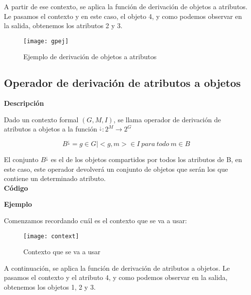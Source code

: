         A partir de ese contexto, se aplica la funci\'on de derivaci\'on de objetos a atributos. 
        Le pasamos el contexto y en este caso, el objeto 4, y como podemos observar en la salida, obtenemos los atributos 2 y 3.

        \begin{figure}[H]
            \centering
            \texttt{[image: gpej]}
            \caption{Ejemplo de derivaci\'on de objetos a atributos}
            \label{fig:gpej}
        \end{figure}



    \subsection{Operador de derivaci\'on de atributos a objetos}

        \textbf{Descripci\'on}

        Dado un contexto formal \( (G, M, I) \), se llama operador de derivaci\'on de atributos a objetos a la 
        funci\'on \( ^\downarrow : 2^M \rightarrow 2^G \)

        \[ B^\downarrow = { g \in G | <g,m> \in I ~ para ~ todo ~ m \in B } \]

        \clearpage

        El conjunto \( B^\downarrow \) es el de los objetos compartidos por todos los atributos de B, en este caso, este operador devolver\'a 
        un conjunto de objetos que ser\'an los que contiene un determinado atributo.
        \\


        \textbf{C\'odigo}

        

        \bigskip

        \textbf{Ejemplo}

        Comenzamos recordando cu\'al es el contexto que se va a usar:

        \begin{figure}[H]
            \centering
            \texttt{[image: context]}
            \caption{Contexto que se va a usar}
            \label{fig:context}
        \end{figure}

        \clearpage

        A continuaci\'on, se aplica la funci\'on de derivaci\'on de atributos a objetos. 
        Le pasamos el contexto y el atributo 4, y como podemos observar en la salida, obtenemos los objetos 1, 2 y 3.

